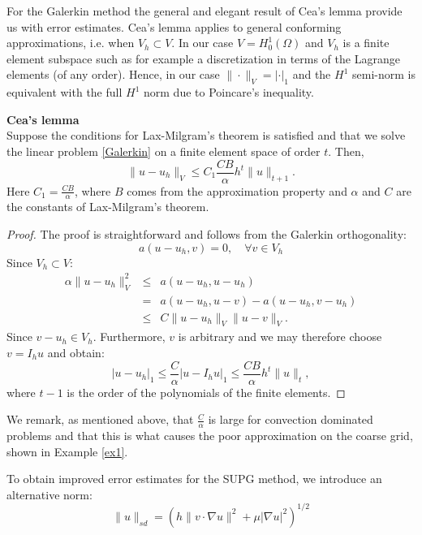 For the Galerkin method the general and elegant result of Cea's lemma
provide us with error estimates. Cea's lemma applies to general 
conforming approximations, i.e. when $V_h \subset V$. In our
case $V=H_0^1(\Omega)$ and $V_h$ is a finite element subspace such 
as for example  a discretization in terms of the Lagrange elements (of any order). Hence, in our case 
$\|\cdot\|_V= |\cdot|_1$ and the $H^1$ semi-norm is equivalent with the full 
$H^1$ norm due to Poincare's inequality. 

\begin{theorem}{\textbf{Cea's lemma}} \\
Suppose the conditions for Lax-Milgram's theorem is satisfied and that
we solve the linear problem \eqref{Galerkin} on a finite element space
of order $t$. Then,     
\[
\|u-u_h\|_V     \le C_1 \frac{C B}{\alpha}  h^{t} \|u\|_{t+1}.   
\]
Here $C_1 = \frac{C B}{\alpha}$, where $B$ comes from the approximation property 
and $\alpha$ and $C$ are the constants of Lax-Milgram's theorem.    
\end{theorem}

\begin{proof}
The proof is straightforward and follows from the Galerkin orthogonality: 
\[
a(u - u_h, v) = 0, \quad \forall v \in V_h 
\]
Since $V_h \subset V$: 
\begin{eqnarray*}
\alpha \|u-u_h\|^2_{V} &\le& a(u-u_h, u-u_h)    \\ 
 &=& a(u-u_h, u-v) - a(u-u_h, v-u_h) \\ 
 &\le& C \|u-u_h\|_V \| u-v\|_V  .      
\end{eqnarray*}
Since $v-u_h\in V_h$. Furthermore,  $v$ is arbitrary and we may therefore choose $v = I_h u$ and obtain:  
\[
	|u-u_h|_1 \le \frac{C}{\alpha} |u - I_h u|_1 \le  \frac{CB}{\alpha} h^{t} \|u\|_t,   
\]
where $t-1$ is the order of the polynomials of the finite elements. 
\end{proof}

We remark, as mentioned above, that 
$\frac{C}{\alpha}$ is large for convection dominated problems and that this is what
causes the poor approximation on the coarse grid, shown in Example \ref{ex1}.  


To obtain improved error estimates for the SUPG method, we introduce  
an alternative norm: 
\begin{equation}
\label{supg:norm}
\|u\|_{sd} = \left(h\|v\cdot\nabla u\|^2 +  \mu |\nabla u|^2\right)^{1/2}
\end{equation}


